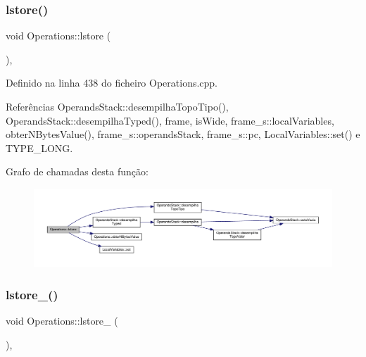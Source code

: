 \subsubsection{\texorpdfstring{lstore()}{lstore()}}
{\footnotesize\ttfamily void Operations\+::lstore (\begin{DoxyParamCaption}{ }\end{DoxyParamCaption})\hspace{0.3cm}{\ttfamily [static]}, {\ttfamily [private]}}



Definido na linha 438 do ficheiro Operations.\+cpp.



Referências Operands\+Stack\+::desempilha\+Topo\+Tipo(), Operands\+Stack\+::desempilha\+Typed(), frame, is\+Wide, frame\+\_\+s\+::local\+Variables, obter\+N\+Bytes\+Value(), frame\+\_\+s\+::operands\+Stack, frame\+\_\+s\+::pc, Local\+Variables\+::set() e T\+Y\+P\+E\+\_\+\+L\+O\+NG.

Grafo de chamadas desta função\+:
\nopagebreak
\begin{figure}[H]
\begin{center}
\leavevmode
\includegraphics[width=350pt]{classOperations_a233917ec136fa6ce064f04b410e15f87_cgraph}
\end{center}
\end{figure}
\mbox{\label{classOperations_ae3c949d56a3ee685668134493595334b}} 
\subsubsection{\texorpdfstring{lstore\+\_()}{lstore\_0()}}
{\footnotesize\ttfamily void Operations\+::lstore\+\_ (\begin{DoxyParamCaption}{ }\end{DoxyParamCaption})\hspace{0.3cm}{\ttfamily [static]}, {\ttfamily [private]}}




